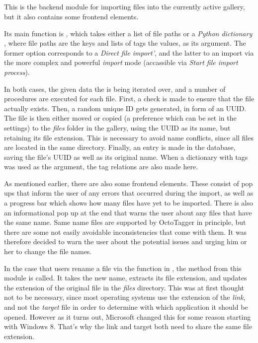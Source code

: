 \subsection{}
\def\kapitelautor{Erik Ritschl}

This is the backend module for importing files into the currently active
gallery, but it also contains some frontend elements.

Its main function is , which takes either a
list of file paths or a \emph{Python dictionary} \cite{PythonDict}, where file paths are the keys and
lists of tags the values, as its argument. The former option corresponds to a
\emph{Direct file import'}, and the latter to an import via the more complex and
powerful \emph{import} mode (accassible via \emph{Start file import process}).

In both cases, the given data the is being iterated over, and a number of
procedures are executed for each file. First, a check is made to ensure that
the file actually exists. Then, a random unique ID gets generated, in form of
an UUID. The file is then either moved or copied (a preference
which can be set in the settings) to the \emph{files} folder in the gallery,
using the UUID as its name, but retaining its file extension. This is necessary to avoid name
conflicts, since all files are located in the same directory. Finally, an entry
is made in the database, saving the file's UUID as well as its
original name. When a dictionary with tags was used as the argument, the tag relations
are also made here.

As mentioned earlier, there are also some frontend elements. These consist of
pop ups that inform the user of any errors that occurred during the import, as
well as a progress bar which shows how many files have yet to be imported.
There is also an informational pop up at the end that warns the user about any
files that have the same name. Same name files are supported by OctoTagger in
principle, but there are some not easily avoidable inconsistencies that come
with them. It was therefore decided to warn the user about the potential issues
and urging him or her to change the file names.

In the case that users rename a file via the  function in , the method  from this module is called. It takes the new name, extracts its file extension, and updates the extension of the original file in the \emph{files} directory. This was at first thought not to be necessary, since most operating systems use the extension of the \emph{link}, and not the \emph{target} file in order to determine with which application it should be opened. However as it turns out, Microsoft changed this for some reason starting with Windows 8. That's why the link and target both need to share the same file extension.